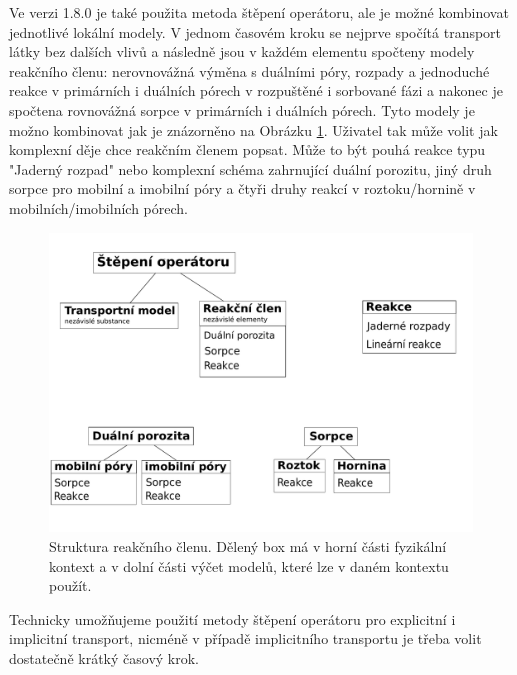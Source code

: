 \documentclass[11pt]{report}
\begin{document}
Ve verzi 1.8.0 je také použita metoda štěpení operátoru, ale je možné kombinovat 
jednotlivé lokální modely. V jednom časovém kroku se nejprve spočítá transport 
látky bez dalších vlivů a následně jsou v každém elementu spočteny
modely reakčního členu: nerovnovážná výměna s duálními póry, rozpady a 
jednoduché reakce v primárních i duálních pórech v rozpuštěné i sorbované fázi a 
nakonec je spočtena rovnovážná sorpce v primárních i duálních pórech. Tyto 
modely je možno kombinovat jak je znázorněno na Obrázku 
\ref{fig:reaction_term}. Uživatel tak může volit jak komplexní děje chce 
reakčním členem popsat. Může to být pouhá reakce typu "Jaderný rozpad" nebo 
komplexní schéma zahrnující duální porozitu, jiný druh sorpce pro mobilní a 
imobilní póry a čtyři druhy reakcí v roztoku/hornině v mobilních/imobilních 
pórech.

\begin{figure}[h]
 \centering
 \includegraphics[scale=0.4]{./reaction_term.pdf}
 \caption{Struktura reakčního členu. Dělený box má v horní části fyzikální 
kontext a v dolní části výčet modelů, které lze v daném kontextu použít.}
 \label{fig:reaction_term}
\end{figure}


Technicky umožňujeme použití 
metody štěpení operátoru pro explicitní i implicitní transport, nicméně v 
případě implicitního transportu je třeba volit dostatečně krátký časový krok.
\end{document}
